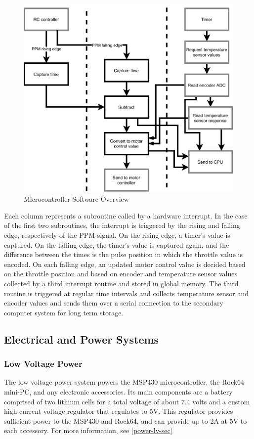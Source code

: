 \documentclass[letterpaper,12pt]{article}
\begin{document}
\begin{figure}[!htbp]\centering
\includegraphics{mcusoftware.pdf}
\caption{Microcontroller Software Overview}
\label{mcu-sw}
\end{figure}

Each column represents a subroutine called by a hardware interrupt. In the case of the first two subroutines, the interrupt is triggered by the rising and falling edge, respectively of the PPM signal. On  the rising edge, a timer's value is captured. On the falling edge, the timer's value is captured again, and the difference between the times is the pulse position in which the throttle value is encoded. On each falling edge, an updated motor control value is decided based on the throttle position and based on encoder and temperature sensor values collected by a third interrupt routine and stored in global memory. The third routine is triggered at regular time intervals and collects temperature sensor and encoder values and sends them over a serial connection to the secondary computer system for long term storage.
\subsection{Electrical and Power Systems}
\subsubsection{Low Voltage Power}
The low voltage power system powers the MSP430 microcontroller, the Rock64 mini-PC, and any electronic accessories. Its main components are a battery comprised of two lithium cells for a total voltage of about 7.4 volts and a custom high-current voltage regulator that regulates to 5V. This regulator provides sufficient power to the MSP430 and Rock64, and can provide up to 2A at 5V to each accessory. For more information, see \ref{power-lv-sec}
\end{document}
